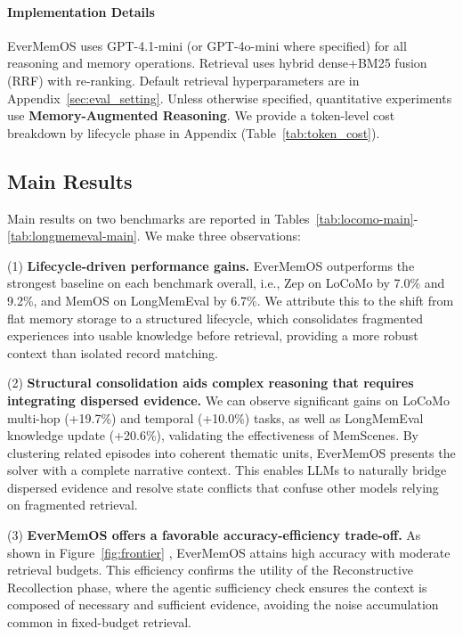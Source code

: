 \paragraph{Implementation Details}
EverMemOS uses GPT-4.1-mini (or GPT-4o-mini where specified) for all reasoning and memory operations. Retrieval uses hybrid dense+BM25 fusion (RRF) with re-ranking. Default retrieval hyperparameters are in Appendix~\ref{sec:eval_setting}. Unless otherwise specified, quantitative experiments use \textbf{Memory-Augmented Reasoning}.
We provide a token-level cost breakdown by lifecycle phase in Appendix (Table~\ref{tab:token_cost}).

\subsection{Main Results}




Main results on two benchmarks are reported in Tables~\ref{tab:locomo-main}-\ref{tab:longmemeval-main}. We make three observations:

(1) \textbf{Lifecycle-driven performance gains.}
EverMemOS outperforms the strongest baseline on each benchmark overall, i.e., Zep on LoCoMo by 7.0\% and 9.2\%, and MemOS on LongMemEval by 6.7\%.
%
We attribute this to the shift from flat memory storage to a structured lifecycle, which consolidates fragmented experiences into usable knowledge before retrieval, providing a more robust context than isolated record matching. 


(2) \textbf{Structural consolidation aids complex reasoning that requires integrating dispersed evidence.}
We can observe significant gains on LoCoMo multi-hop (+19.7\%) and temporal (+10.0\%) tasks, as well as LongMemEval knowledge update (+20.6\%), validating the effectiveness of MemScenes. By clustering related episodes into coherent thematic units, EverMemOS presents the solver with a complete narrative context. This enables LLMs to naturally bridge dispersed evidence and resolve state conflicts that confuse other models relying on fragmented retrieval.

(3) \textbf{EverMemOS offers a favorable accuracy-efficiency trade-off.}
%
As shown in Figure~\ref{fig:frontier} , EverMemOS attains high accuracy with moderate retrieval budgets. This efficiency confirms the utility of the Reconstructive Recollection phase, where the agentic sufficiency check ensures the context is composed of necessary and sufficient evidence, avoiding the noise accumulation common in fixed-budget retrieval.

